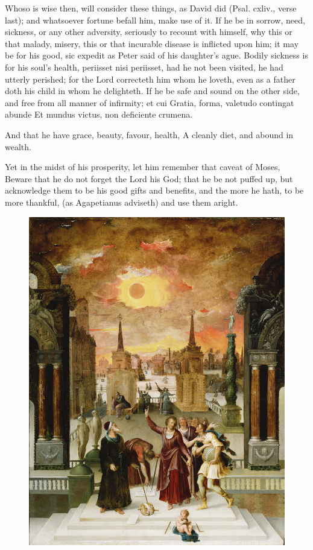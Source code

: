 {Whoso is wise then, will consider these things, as David did (Psal. cxliv., verse last); and whatsoever fortune befall him, make use of it.
If he be in sorrow, need, sickness, or any other adversity, seriously to recount with himself, why this or that malady, misery, this or that incurable disease is inflicted upon him; it may be for his good, sic expedit as Peter said of his daughter's ague.
Bodily sickness is for his soul's health, periisset nisi periisset, had he not been visited, he had utterly perished; for the Lord correcteth him whom he loveth, even as a father doth his child in whom he delighteth.
If he be safe and sound on the other side, and free from all manner of infirmity; et cui Gratia, forma, valetudo contingat abunde Et mundus victus, non deficiente crumena.

And that he have grace, beauty, favour, health,
A cleanly diet, and abound in wealth.

Yet in the midst of his prosperity, let him remember that caveat of
Moses, Beware that he do not forget the Lord his God; that he be
not puffed up, but acknowledge them to be his good gifts and benefits,
and the more he hath, to be more thankful, (as Agapetianus
adviseth) and use them aright.

\begin{figure}[p]
  \begingroup
  \centering
  \includegraphics[keepaspectratio,width=\textwidth]{figures/caron-dionysius-converts-pagans-small.jpg}
  \label{fig:dionysiusconvertspagans}
\end{figure}

}
